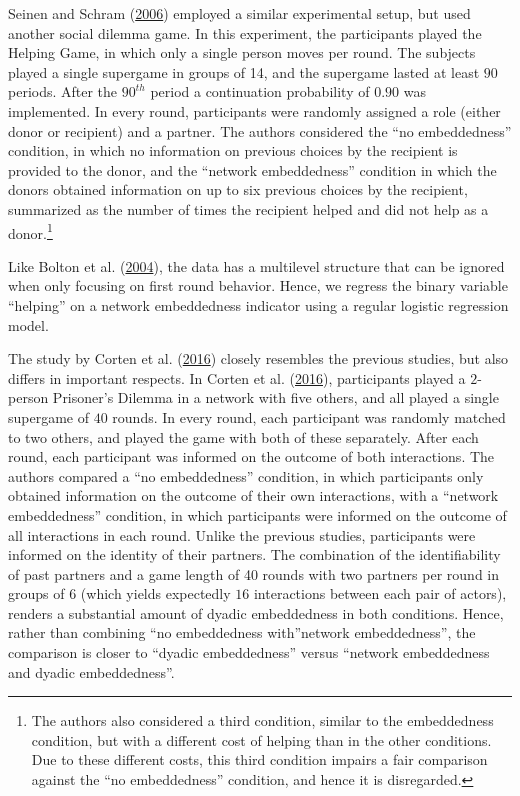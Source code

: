 \documentclass[
  11pt,
]{article}
\begin{document}
Seinen and Schram (\protect\hyperlink{ref-seinen_schram_social_2006}{2006}) employed a similar experimental setup, but used another social dilemma game.
In this experiment, the participants played the Helping Game, in which only a single person moves per round.
The subjects played a single supergame in groups of 14, and the supergame lasted at least \(90\) periods.
After the \(90^{th}\) period a continuation probability of \(0.90\) was implemented.
In every round, participants were randomly assigned a role (either donor or recipient) and a partner.
The authors considered the ``no embeddedness'' condition, in which no information on previous choices by the recipient is provided to the donor, and the ``network embeddedness'' condition in which the donors obtained information on up to six previous choices by the recipient, summarized as the number of times the recipient helped and did not help as a donor.\footnote{
  The authors also considered a third condition, similar to the embeddedness condition, but with a different cost of helping than in the other conditions. Due to these different costs, this third condition impairs a fair comparison against the ``no embeddedness'' condition, and hence it is disregarded.}

Like Bolton et al. (\protect\hyperlink{ref-bolton_electronic_2004}{2004}), the data has a multilevel structure that can be ignored when only focusing on first round behavior.
Hence, we regress the binary variable ``helping'' on a network embeddedness indicator using a regular logistic regression model.

The study by Corten et al. (\protect\hyperlink{ref-corten_etal_reputation_2016}{2016}) closely resembles the previous studies, but also differs in important respects.
In Corten et al. (\protect\hyperlink{ref-corten_etal_reputation_2016}{2016}), participants played a \(2\)-person Prisoner's Dilemma in a network with five others, and all played a single supergame of \(40\) rounds.
In every round, each participant was randomly matched to two others, and played the game with both of these separately.
After each round, each participant was informed on the outcome of both interactions.
The authors compared a ``no embeddedness'' condition, in which participants only obtained information on the outcome of their own interactions, with a ``network embeddedness'' condition, in which participants were informed on the outcome of all interactions in each round.
Unlike the previous studies, participants were informed on the identity of their partners.
The combination of the identifiability of past partners and a game length of 40 rounds with two partners per round in groups of \(6\) (which yields expectedly \(16\) interactions between each pair of actors), renders a substantial amount of dyadic embeddedness in both conditions.
Hence, rather than combining ``no embeddedness with''network embeddedness'', the comparison is closer to ``dyadic embeddedness'' versus ``network embeddedness and dyadic embeddedness''.
\end{document}
